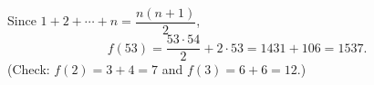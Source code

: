 Since $1+2+\cdots+n=\dfrac{n(n+1)}{2}$,
\[
f(53)=\dfrac{53\cdot54}{2}+2\cdot53=1431+106=\boxed{1537}.
\]
(Check: $f(2)=3+4=7$ and $f(3)=6+6=12$.)
